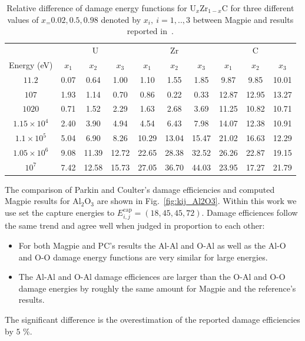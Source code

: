 \documentclass[review]{elsarticle}
\begin{document}
\begin{table}[p]
  \centering
  \caption{Relative difference of damage energy functions for  $\text{U}_x\text{Zr}_{1-x}\text{C}$ for three different values of $x_=0.02, 0.5, 0.98$  denoted by $x_i,~i=1,..,3$ between Magpie and results reported in~\cite{PC1980}. \label{tab:UZrC_energy_comparison}}
\begin{tabular}{c c c c c c c c c c}
         & \multicolumn{3}{c}{U} & \multicolumn{3}{c}{Zr} & \multicolumn{3}{c}{C} \\
         \cline{2-4} \cline{5-7} \cline{7-10}
Energy (eV)              & $x_1$& $x_2$& $x_3$& $x_1$&$x_2$ &$x_3$ &$x_1$&$x_2$ &$x_3$\\
\hline
   $11.2$ &     0.07 &     0.64 &     1.00 &     1.10 &     1.55 &     1.85 &     9.87 &     9.85 &    10.01 \\
   $107$ &     1.93 &     1.14 &     0.70 &     0.86 &     0.22 &     0.33 &    12.87 &    12.95 &    13.27 \\
 $1020$ &     0.71 &     1.52 &     2.29 &     1.63 &     2.68 &     3.69 &    11.25 &    10.82 &    10.71 \\
$1.15 \times 10^4$ &     2.40 &     3.90 &     4.94 &     4.54 &     6.43 &     7.98 &    14.07 &    12.38 &    10.91 \\
$1.1 \times 10^5$ &     5.04 &     6.90 &     8.26 &    10.29 &    13.04 &    15.47 &    21.02 &    16.63 &    12.29 \\
$1.05 \times 10^6$ &     9.08 &    11.39 &    12.72 &    22.65 &    28.38 &    32.52 &    26.26 &    22.87 &    19.15 \\
$10^7$ &     7.42 &    12.58 &    15.73 &    27.05 &    36.70 &    44.03 &    23.95 &    17.27 &    21.79 \\
\hline
\end{tabular}
\end{table}

The comparison of Parkin and Coulter's damage efficiencies and computed Magpie results for  $\text{Al}_2\text{O}_3$ are shown in Fig.~\ref{fig:kij_Al2O3}. Within this work we use set the capture energies to $E_{i,j}^{\text{cap}} = (18, 45, 45, 72)$. Damage efficiences follow the same trend 
and agree well when judged in proportion to each other:
\begin{itemize}
  \item For both Magpie and PC's results the Al-Al and O-Al as well as the Al-O and O-O damage energy functions are very similar for large energies. 
  \item The Al-Al and O-Al damage efficiences are larger than the O-Al and O-O damage energies by roughly the same amount for Magpie and the reference's results. 
\end{itemize}
The significant difference is the overestimation of the reported damage efficiencies by $5$ \%.
\end{document}
